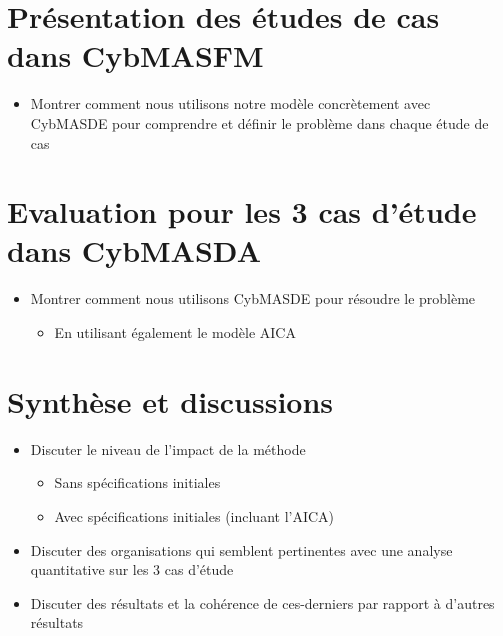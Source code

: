 \section{Présentation des études de cas dans CybMASFM}
\begin{itemize}

    \item Montrer comment nous utilisons notre modèle concrètement avec CybMASDE pour comprendre et définir le problème dans chaque étude de cas
\end{itemize}

\section{Evaluation pour les 3 cas d’étude dans CybMASDA}
\begin{itemize}

    \item Montrer comment nous utilisons CybMASDE pour résoudre le problème
          \begin{itemize}
              \item En utilisant également le modèle AICA
          \end{itemize}
\end{itemize}

\section{Synthèse et discussions}
\begin{itemize}

    \item Discuter le niveau de l'impact de la méthode
          \begin{itemize}
              \item Sans spécifications initiales
              \item Avec spécifications initiales (incluant l'AICA)
          \end{itemize}
    \item Discuter des organisations qui semblent pertinentes avec une analyse quantitative sur les 3 cas d'étude
    \item Discuter des résultats et la cohérence de ces-derniers par rapport à d'autres résultats
\end{itemize}
